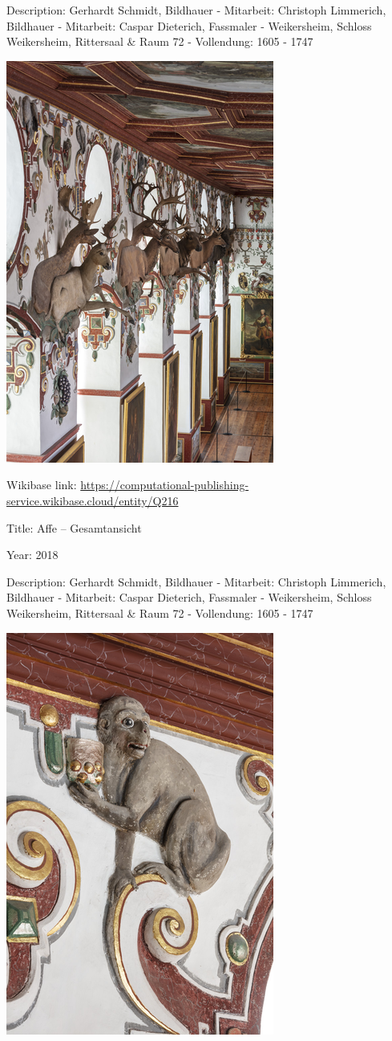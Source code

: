 \documentclass[
  letterpaper,
]{book}
\begin{document}
Description: Gerhardt Schmidt, Bildhauer - Mitarbeit: Christoph
Limmerich, Bildhauer - Mitarbeit: Caspar Dieterich, Fassmaler -
Weikersheim, Schloss Weikersheim, Rittersaal \& Raum 72 - Vollendung:
1605 - 1747

\includegraphics{paintings_files/figure-pdf/cell-3-output-8.png}

Wikibase link:
\url{https://computational-publishing-service.wikibase.cloud/entity/Q216}

Title: Affe -- Gesamtansicht

Year: 2018

Description: Gerhardt Schmidt, Bildhauer - Mitarbeit: Christoph
Limmerich, Bildhauer - Mitarbeit: Caspar Dieterich, Fassmaler -
Weikersheim, Schloss Weikersheim, Rittersaal \& Raum 72 - Vollendung:
1605 - 1747

\includegraphics{paintings_files/figure-pdf/cell-3-output-10.png}
\end{document}
